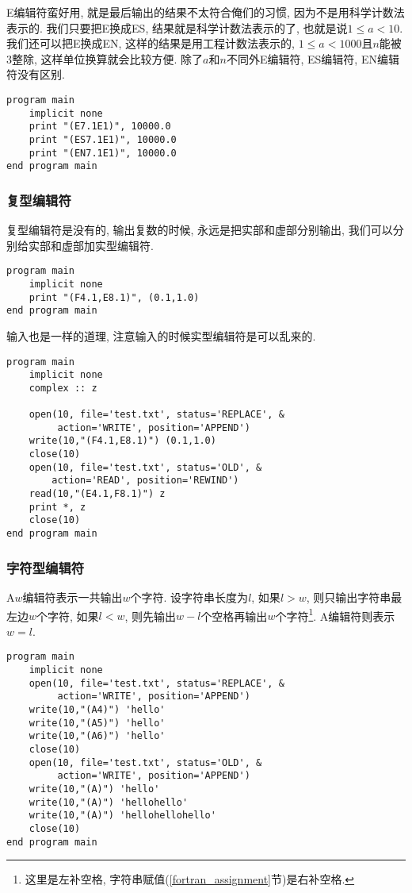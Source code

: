 E编辑符蛮好用, 就是最后输出的结果不太符合俺们的习惯, 因为不是用科学计数法表示的. 我们只要把E换成ES, 结果就是科学计数法表示的了, 也就是说$1\leqslant a<10$. 我们还可以把E换成EN, 这样的结果是用工程计数法表示的, $1\leqslant a<1000$且$n$能被$3$整除, 这样单位换算就会比较方便. 除了$a$和$n$不同外E编辑符, ES编辑符, EN编辑符没有区别.
\begin{lstlisting}
program main
    implicit none
    print "(E7.1E1)", 10000.0
    print "(ES7.1E1)", 10000.0
    print "(EN7.1E1)", 10000.0
end program main
\end{lstlisting}

\subsubsection{复型编辑符}

复型编辑符是没有的, 输出复数的时候, 永远是把实部和虚部分别输出, 我们可以分别给实部和虚部加实型编辑符.
\begin{lstlisting}
program main
    implicit none
    print "(F4.1,E8.1)", (0.1,1.0)
end program main
\end{lstlisting}
输入也是一样的道理, 注意输入的时候实型编辑符是可以乱来的.
\begin{lstlisting}
program main
    implicit none
    complex :: z

    open(10, file='test.txt', status='REPLACE', &
         action='WRITE', position='APPEND')
    write(10,"(F4.1,E8.1)") (0.1,1.0)
    close(10)
    open(10, file='test.txt', status='OLD', &
        action='READ', position='REWIND')
    read(10,"(E4.1,F8.1)") z
    print *, z
    close(10)
end program main
\end{lstlisting}

\subsubsection{字符型编辑符}

A$w$编辑符表示一共输出$w$个字符. 设字符串长度为$l$, 如果$l>w$, 则只输出字符串最左边$w$个字符, 如果$l<w$, 则先输出$w-l$个空格再输出$w$个字符\footnote{这里是左补空格, 字符串赋值(\ref{fortran_assignment}节)是右补空格.}. A编辑符则表示$w=l$.
\begin{lstlisting}
program main
    implicit none
    open(10, file='test.txt', status='REPLACE', &
         action='WRITE', position='APPEND')
    write(10,"(A4)") 'hello'
    write(10,"(A5)") 'hello'
    write(10,"(A6)") 'hello'
    close(10)
    open(10, file='test.txt', status='OLD', &
         action='WRITE', position='APPEND')
    write(10,"(A)") 'hello'
    write(10,"(A)") 'hellohello'
    write(10,"(A)") 'hellohellohello'
    close(10)
end program main
\end{lstlisting}

